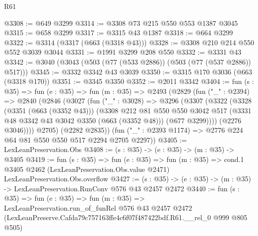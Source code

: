 \begin{lexlean}{R61}
\begin{coremodule}
@3308 := @649 @3299
@3314 := @3308 @73 @215 @550 @553 @1387 @3045
@3315 := @658 @3299
@3317 := @3315 @43 @1387
@3318 := @664 @3299
@3322 := @3314 (@3317 (@663 (@3318 @43)))
@3328 := @3308 @210 @214 @550 @552 @3039 @3044
@3331 := @1991 @3299 @208 @550
@3332 := @3331 @43
@3342 := @3040 (@3043 (@503 (@77 (@533 @2886)) (@503 (@77 (@537 @2886)) @517)))
@3345 := @3332 @3342 @43 @3039
@3350 := @3315 @170 @3036 (@663 (@3318 @170))
@3351 := @3345 @3350
@3352 := @2011 @3342
@3404 := fun (s : @35) =>
  fun (e : @35) =>
  fun (m : @35) =>
  @2493
    (@2829
      (fun ("_" : @2394) =>
      @2840
        (@2846
          (@3027
            (fun ("_" : @3028) =>
            @3296
              (@3307
                (@3322
                  (@3328
                    (@3351 (@663 (@3352 @43)))
                    (@3308
                      @212
                      @81
                      @550
                      @550
                      @3042
                      @517
                      (@3331 @48 @3342 @43 @3042 @3350 (@663 (@3352 @48)))
                      (@677 @3299))))
                (@2276 @3046))))
          @2705)
        (@2282 @2835))
      (fun ("_" : @2393 @1174) => @2776 @224 @64 @81 @550 @550 @517 @2294 @2705 @2297))
@3405 := LexLeanPreservation.Obs
@3408 := (s : @35) -> (e : @35) -> (m : @35) -> @3405
@3419 := fun (s : @35) =>
  fun (e : @35) =>
  fun (m : @35) =>
  cond.{1} @3405 @2462 (LexLeanPreservation.Obs.value @2471) LexLeanPreservation.Obs.overflow
@3427 := (s : @35) -> (e : @35) -> (m : @35) -> LexLeanPreservation.RunConv @576 @43 @2457 @2472
@3440 := fun (s : @35) =>
  fun (e : @35) =>
  fun (m : @35) =>
  LexLeanPreservation.run_of_funRel
    @576
    @43
    @2457
    @2472
    (LexLeanPreserve.Cafda79c757163ffe4c6f07f487422bdf.R61.__rel_0 @999 @805 @505)
\end{coremodule}
\end{lexlean}
